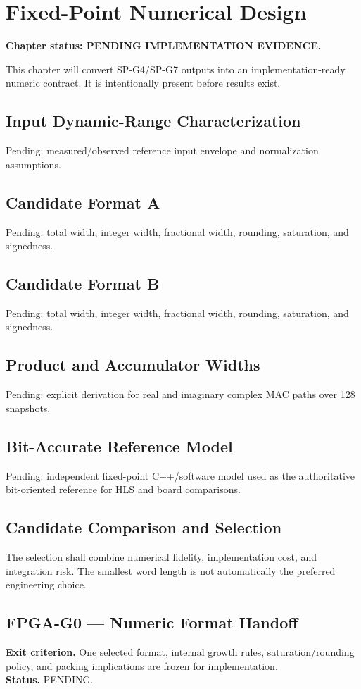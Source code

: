 \chapter{Fixed-Point Numerical Design}
\label{ch:fixed-point}
\textbf{Chapter status: PENDING IMPLEMENTATION EVIDENCE.}

This chapter will convert SP-G4/SP-G7 outputs into an implementation-ready numeric
contract. It is intentionally present before results exist.

\section{Input Dynamic-Range Characterization}
Pending: measured/observed reference input envelope and normalization assumptions.

\section{Candidate Format A}
Pending: total width, integer width, fractional width, rounding, saturation, and signedness.

\section{Candidate Format B}
Pending: total width, integer width, fractional width, rounding, saturation, and signedness.

\section{Product and Accumulator Widths}
Pending: explicit derivation for real and imaginary complex MAC paths over 128 snapshots.

\section{Bit-Accurate Reference Model}
Pending: independent fixed-point C++/software model used as the authoritative bit-oriented
reference for HLS and board comparisons.

\section{Candidate Comparison and Selection}
The selection shall combine numerical fidelity, implementation cost, and integration risk.
The smallest word length is not automatically the preferred engineering choice.

\section{FPGA-G0 --- Numeric Format Handoff}
\textbf{Exit criterion.} One selected format, internal growth rules, saturation/rounding
policy, and packing implications are frozen for implementation.\\
\textbf{Status.} PENDING.
